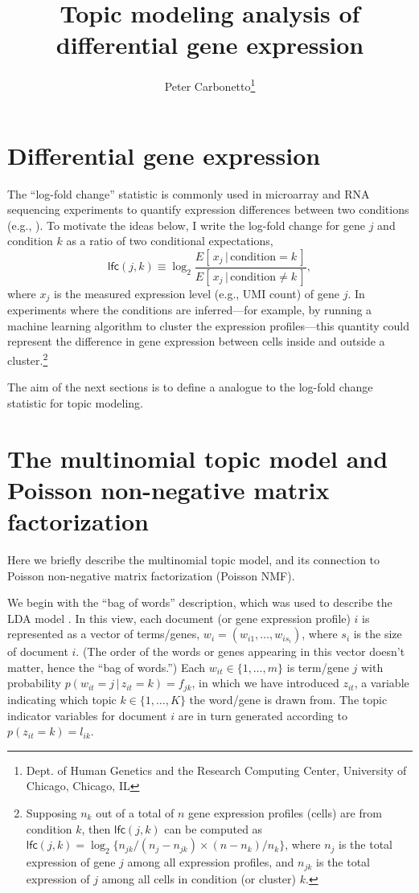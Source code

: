 \documentclass[final]{siamart171218}
\title{Topic modeling analysis of differential gene expression}
\author{Peter Carbonetto\thanks{Dept. of Human Genetics and the Research Computing Center, University of Chicago, Chicago, IL}}
\begin{document}
\maketitle

\section{Differential gene expression}

The ``log-fold change'' statistic is commonly used in microarray and
RNA sequencing experiments to quantify expression differences between
two conditions (e.g., \cite{cui-churchill-2003, quackenbush-2002}). To
motivate the ideas below, I write the log-fold change for gene $j$ and
condition $k$ as a ratio of two conditional expectations,
\begin{equation}
\mathsf{lfc}(j,k) \equiv
\log_2 \frac{E[\,x_j \,|\, \mathrm{condition} = k\,]}
            {E[\,x_j \,|\, \mathrm{condition} \neq k\,]},
\end{equation}
where $x_j$ is the measured expression level (e.g., UMI count) of gene
$j$. In experiments where the conditions are inferred---for example,
by running a machine learning algorithm to cluster the expression
profiles---this quantity could represent the difference in gene
expression between cells inside and outside a
cluster.\footnote{Supposing $n_k$ out of a total of $n$ gene
  expression profiles (cells) are from condition $k$, then
  $\mathsf{lfc}(j,k)$ can be computed as $\mathsf{lfc}(j,k) = \log_2
  \{n_{jk}/(n_j - n_{jk}) \times (n - n_k)/n_k \}$, where $n_j$ is the
  total expression of gene $j$ among all expression profiles, and
  $n_{jk}$ is the total expression of $j$ among all cells in condition
  (or cluster) $k$.}

The aim of the next sections is to define a analogue to the log-fold
change statistic for topic modeling.

\section{The multinomial topic model and Poisson non-negative matrix
  factorization}

Here we briefly describe the multinomial topic model, and its
connection to Poisson non-negative matrix factorization (Poisson NMF).

We begin with the ``bag of words'' description, which was used to
describe the LDA model \cite{blei-2003}. In this view, each document
(or gene expression profile) $i$ is represented as a vector of
terms/genes, $w_i = (w_{i1}, \ldots, w_{is_i})$, where $s_i$ is the
size of document $i$. (The order of the words or genes appearing in
this vector doesn't matter, hence the ``bag of words.'') Each $w_{it}
\in \{1, \ldots, m\}$ is term/gene $j$ with probability
$p(w_{it} = j \,|\, z_{it} = k) = f_{jk}$, in which we have introduced
$z_{it}$, a variable indicating which topic $k \in \{1, \ldots, K\}$
the word/gene is drawn from. The topic indicator variables for
document $i$ are in turn generated according to $p(z_{it} = k) =
l_{ik}$.
\end{document}
